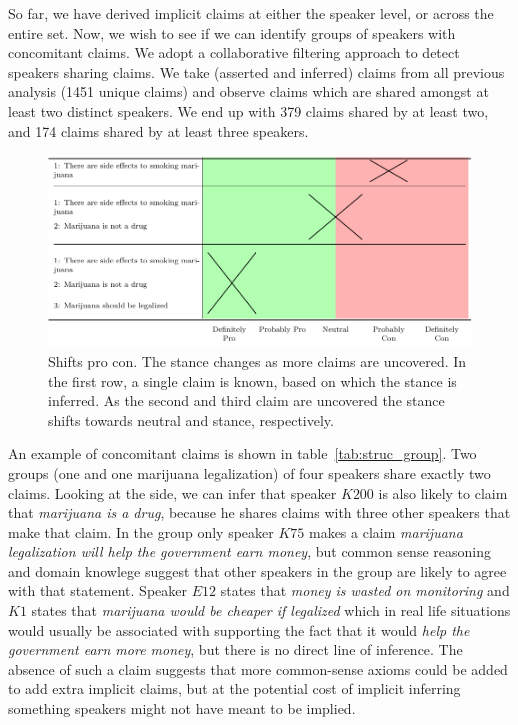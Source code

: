 So far, we have derived implicit claims at either the speaker level, or across
the entire set. Now, we wish to see if we can identify groups of speakers with
concomitant claims. We adopt a collaborative filtering approach
\citep{herlocker1999algorithmic} to detect speakers sharing claims.  We take
(asserted and inferred) claims  from all previous analysis (1451 unique claims)
and observe claims which are shared amongst at least two distinct speakers.
We end up with 379 claims shared by at least two, and 174 claims shared by at least three
speakers. 

\begin{figure}[t]
	\includegraphics{struc_arg_shift-figure0.pdf}
\caption{Shifts pro con. The stance changes as more claims are uncovered. In the first row, 
a single claim is known, based on which the  stance is inferred.
As the second and third claim are uncovered the stance shifts towards neutral and 
 stance, respectively.
}
\label{fig:pro_con_shift}
\end{figure}


An example of concomitant claims is shown in table~\ref{tab:struc_group}. 
Two groups (one  and one  marijuana legalization)
of four speakers share exactly two claims. Looking at the  side, we
can infer that speaker $K200$ is also likely to claim that \emph{marijuana is a drug}, because
he shares claims with three other speakers that make that claim.
In the  group only speaker $K75$ makes a claim 
\emph{marijuana legalization will help the government earn money}, but
common sense reasoning and domain knowlege suggest that other speakers in the group
are likely to agree with that statement. Speaker $E12$ states 
that \emph{money is wasted on monitoring} and $K1$ states that \emph{
marijuana would be cheaper if legalized} which in real life situations 
would usually be associated with supporting the fact that it would
\emph{help the government earn more money}, but there is no direct line of inference.
The absence of such a claim suggests that more common-sense axioms could be
added to add extra implicit claims, but at the potential cost of 
implicit inferring something speakers might not have meant to be implied. 

